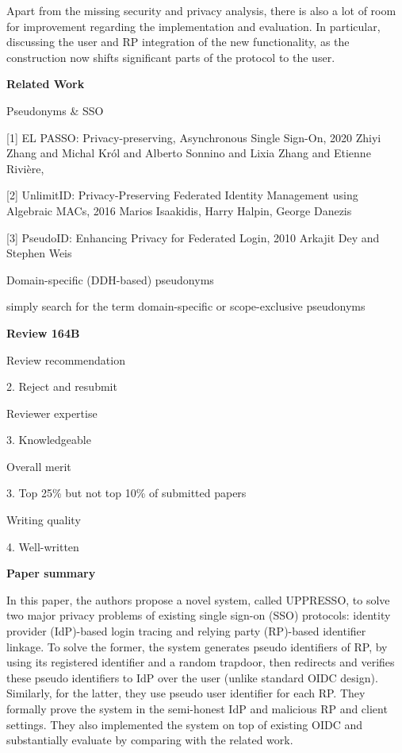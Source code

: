 \documentclass[letterpaper,onecolumn,10pt]{article}
\begin{document}
Apart from the missing security and privacy analysis, there is also a lot of room for improvement regarding the implementation and evaluation. In particular, discussing the user and RP integration of the new functionality, as the construction now shifts significant parts of the protocol to the user.


\vspace{1mm}\noindent\textbf{Related Work}


Pseudonyms \& SSO


[1] EL PASSO: Privacy-preserving, Asynchronous Single Sign-On, 2020
Zhiyi Zhang and
               Michal Kr{\'{o}}l and
               Alberto Sonnino and
               Lixia Zhang and
               Etienne Rivi{\`{e}}re,

[2] UnlimitID: Privacy-Preserving Federated Identity Management using Algebraic MACs, 2016
Marios Isaakidis, Harry Halpin, George Danezis

[3] PseudoID: Enhancing Privacy for Federated Login, 2010
Arkajit Dey and Stephen Weis

Domain-specific (DDH-based) pseudonyms


simply search for the term domain-specific or scope-exclusive pseudonyms




\vspace{1mm}\noindent\textbf{Review 164B}


Review recommendation


2. Reject and resubmit

Reviewer expertise


3. Knowledgeable

Overall merit


3. Top 25\% but not top 10\% of submitted papers

Writing quality


4. Well-written

\vspace{1mm}\noindent\textbf{Paper summary}


In this paper, the authors propose a novel system, called UPPRESSO, to solve two major privacy problems of existing single sign-on (SSO) protocols: identity provider (IdP)-based login tracing and relying party (RP)-based identifier linkage. To solve the former, the system generates pseudo identifiers of RP, by using its registered identifier and a random trapdoor, then redirects and verifies these pseudo identifiers to IdP over the user (unlike standard OIDC design). Similarly, for the latter, they use pseudo user identifier for each RP. They formally prove the system in the semi-honest IdP and malicious RP and client settings. They also implemented the system on top of existing OIDC and substantially evaluate by comparing with the related work.
\end{document}
